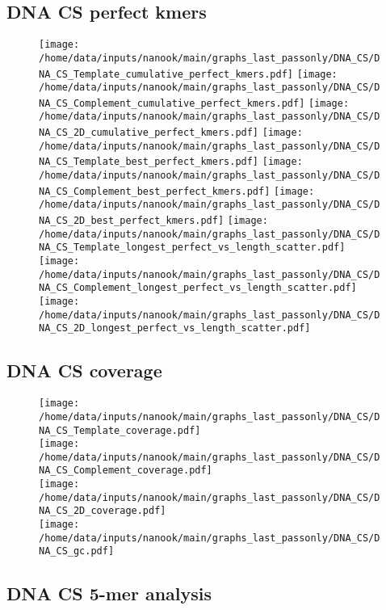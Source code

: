 \documentclass[a4paper,11pt,oneside]{article}
\begin{document}
\subsection*{DNA CS perfect kmers}
\vspace{-3mm}
\begin{figure}[H]
\centering
\texttt{[image: /home/data/inputs/nanook/main/graphs\_last\_passonly/DNA\_CS/DNA\_CS\_Template\_cumulative\_perfect\_kmers.pdf]}
\texttt{[image: /home/data/inputs/nanook/main/graphs\_last\_passonly/DNA\_CS/DNA\_CS\_Complement\_cumulative\_perfect\_kmers.pdf]}
\texttt{[image: /home/data/inputs/nanook/main/graphs\_last\_passonly/DNA\_CS/DNA\_CS\_2D\_cumulative\_perfect\_kmers.pdf]}
\texttt{[image: /home/data/inputs/nanook/main/graphs\_last\_passonly/DNA\_CS/DNA\_CS\_Template\_best\_perfect\_kmers.pdf]}
\texttt{[image: /home/data/inputs/nanook/main/graphs\_last\_passonly/DNA\_CS/DNA\_CS\_Complement\_best\_perfect\_kmers.pdf]}
\texttt{[image: /home/data/inputs/nanook/main/graphs\_last\_passonly/DNA\_CS/DNA\_CS\_2D\_best\_perfect\_kmers.pdf]}
\texttt{[image: /home/data/inputs/nanook/main/graphs\_last\_passonly/DNA\_CS/DNA\_CS\_Template\_longest\_perfect\_vs\_length\_scatter.pdf]}
\texttt{[image: /home/data/inputs/nanook/main/graphs\_last\_passonly/DNA\_CS/DNA\_CS\_Complement\_longest\_perfect\_vs\_length\_scatter.pdf]}
\texttt{[image: /home/data/inputs/nanook/main/graphs\_last\_passonly/DNA\_CS/DNA\_CS\_2D\_longest\_perfect\_vs\_length\_scatter.pdf]}
\end{figure}
\subsection*{DNA CS coverage}
\vspace{-3mm}
\begin{figure}[H]
\centering
\texttt{[image: /home/data/inputs/nanook/main/graphs\_last\_passonly/DNA\_CS/DNA\_CS\_Template\_coverage.pdf]} \\
\texttt{[image: /home/data/inputs/nanook/main/graphs\_last\_passonly/DNA\_CS/DNA\_CS\_Complement\_coverage.pdf]} \\
\texttt{[image: /home/data/inputs/nanook/main/graphs\_last\_passonly/DNA\_CS/DNA\_CS\_2D\_coverage.pdf]} \\
\texttt{[image: /home/data/inputs/nanook/main/graphs\_last\_passonly/DNA\_CS/DNA\_CS\_gc.pdf]}
\end{figure}
\subsection*{DNA CS 5-mer analysis}
\end{document}
